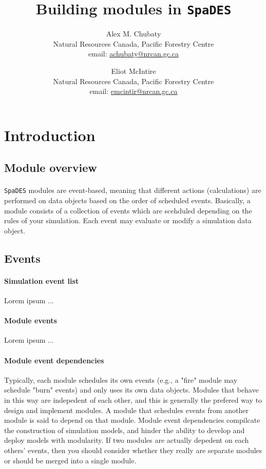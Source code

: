 \documentclass{article}
\title{Building modules in \texttt{SpaDES}}
\author{
  Alex M. Chubaty\\
  \small{Natural Resources Canada, Pacific Forestry Centre}\\
  \small{email: \href{mailto:achubaty@nrcan.gc.ca}{achubaty@nrcan.gc.ca}}
  \and
  Eliot McIntire\\
	\small{Natural Resources Canada, Pacific Forestry Centre}\\
	\small{email: \href{mailto:emcintir@nrcan.gc.ca}{emcintir@nrcan.gc.ca}}
}
\begin{document}


\maketitle

\tableofcontents

\newpage

\section{Introduction}

\subsection{Module overview} %

\paragraph{}
\texttt{SpaDES} modules are event-based, meaning that different actions (calculations) are performed on data objects based on the order of scheduled events. Basically, a module consists of a collection of events which are scehduled depending on the rules of your simulation. Each event may evaluate or modify a simulation data object.

\subsection{Events}

\paragraph{Simulation event list}
Lorem ipsum ...

\paragraph{Module events}
Lorem ipsum ...

\paragraph{Module event dependencies}
Typically, each module schedules its own events (e.g., a "fire" module may schedule "burn" events) and only uses its own data objects. Modules that behave in this way are indepedent of each other, and this is generally the prefered way to design and implement modules. A module that schedules events from another module is said to depend on that module. Module event dependencies compilcate the construction of simulation models, and hinder the ability to develop and deploy models with modularity. If two modules are actually depedent on each others' events, then you should consider whether they really are separate modules or should be merged into a single module.
\end{document}
